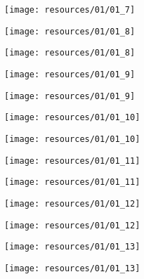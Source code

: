 \begin{frame}{ }
    \centering
    \texttt{[image: resources/01/01\_7]}
\end{frame}
\begin{frame}{ }
    \centering
    \texttt{[image: resources/01/01\_8]}
\end{frame}
\begin{frame}{ }
    \centering
    \texttt{[image: resources/01/01\_8]}
\end{frame}
\begin{frame}{ }
    \centering
    \texttt{[image: resources/01/01\_9]}
\end{frame}
\begin{frame}{ }
    \centering
    \texttt{[image: resources/01/01\_9]}
\end{frame}
\begin{frame}{ }
    \centering
    \texttt{[image: resources/01/01\_10]}
\end{frame}
\begin{frame}{ }
    \centering
    \texttt{[image: resources/01/01\_10]}
\end{frame}
\begin{frame}{ }
    \centering
    \texttt{[image: resources/01/01\_11]}
\end{frame}
\begin{frame}{ }
    \centering
    \texttt{[image: resources/01/01\_11]}
\end{frame}
\begin{frame}{ }
    \centering
    \texttt{[image: resources/01/01\_12]}
\end{frame}
\begin{frame}{ }
    \centering
    \texttt{[image: resources/01/01\_12]}
\end{frame}
\begin{frame}{ }
    \centering
    \texttt{[image: resources/01/01\_13]}
\end{frame}
\begin{frame}{ }
    \centering
    \texttt{[image: resources/01/01\_13]}
\end{frame}

